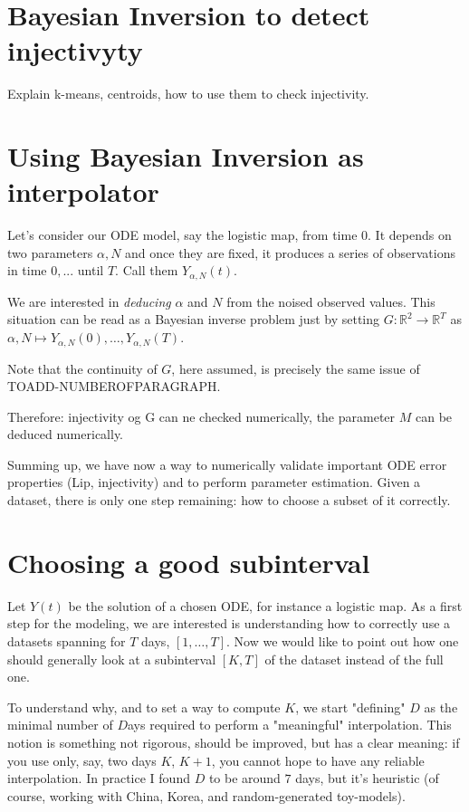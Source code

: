 \documentclass[6pt]{article}
\begin{document}
\section{Bayesian Inversion to detect injectivyty}
Explain k-means, centroids, how to use them to check
injectivity. 

\section {Using Bayesian Inversion as interpolator}
Let's consider our ODE model, say the logistic map, from time $0$.
It depends on two parameters $\alpha, N$ and once they are fixed,
it produces a series of observations in time $0,...$ until $T$.
Call them $Y_{\alpha, N}(t)$.

We are interested in \emph{deducing} $\alpha$ and $N$ from the noised
observed values. This situation can be read as a Bayesian inverse problem 
just by setting 
$G : \mathbb{R}^2 \to \mathbb{R}^T$ as
$\alpha, N \mapsto Y_{\alpha, N} (0), \dots, Y_{\alpha, N} (T)$.

Note that the continuity of $G$, here assumed, is precisely the same issue
of TOADD-NUMBEROFPARAGRAPH. 

Therefore: injectivity og G can ne checked numerically,
the parameter $M$ can be deduced numerically.

Summing up, we have now a way to numerically validate important ODE error
properties (Lip, injectivity) and to perform parameter estimation.
Given a dataset, there is only one step remaining: how to choose
a subset of it correctly.

\section{Choosing a good subinterval}
Let $Y(t)$ be the solution of a chosen ODE, for instance a logistic map.
As a first step for the modeling, we are interested is understanding 
how to correctly use a datasets spanning for $T$ days, $[1, \dots, T]$.
Now we would like to point out how one should generally
look at a subinterval $[K, T]$ of the dataset instead of the full one.

To understand why, and to set a way to compute $K$, we start 
"defining" $D$ as the minimal number of $D$ays required to perform a 
"meaningful" interpolation. This notion is something not rigorous, should
be improved, but has a clear meaning:
if you use only, say, two days $K$, $K+1$, you cannot hope to have any 
reliable interpolation. In practice I found $D$ to be around $7$ days,
but it's heuristic 
(of course, working with China, Korea, and random-generated toy-models).
\end{document}
